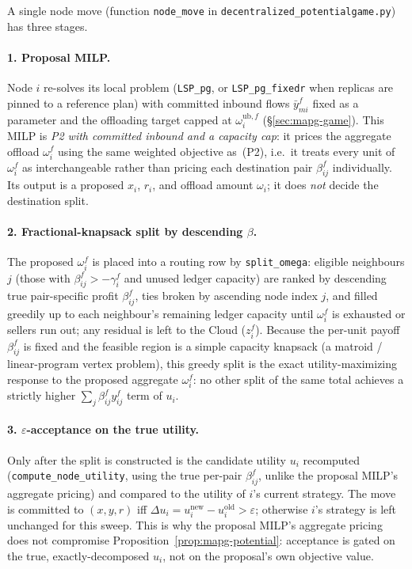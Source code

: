 A single node move (function \texttt{node\_move} in
\texttt{decentralized\_potentialgame.py}) has three stages.

\paragraph{1. Proposal MILP.} Node $i$ re-solves its local problem
(\texttt{LSP\_pg}, or \texttt{LSP\_pg\_fixedr} when replicas are pinned to a
reference plan) with committed inbound flows $\bar y_{mi}^f$ fixed as a
parameter and the offloading target capped at $\omega_i^{\mathrm{ub},f}$
(\S\ref{sec:mapg-game}). This MILP is \emph{P2 with committed inbound and a
capacity cap}: it prices the aggregate offload $\omega_i^f$ using the same
weighted objective as~(P2), i.e.\ it treats every unit of $\omega_i^f$ as
interchangeable rather than pricing each destination pair $\beta_{ij}^f$
individually. Its output is a proposed $x_i$, $r_i$, and offload amount
$\omega_i$; it does \emph{not} decide the destination split.

\paragraph{2. Fractional-knapsack split by descending $\beta$.} The proposed
$\omega_i^f$ is placed into a routing row by \texttt{split\_omega}: eligible
neighbours $j$ (those with $\beta_{ij}^f>-\gamma_i^f$ and unused ledger
capacity) are ranked by descending true pair-specific profit $\beta_{ij}^f$,
ties broken by ascending node index $j$, and filled greedily up to each
neighbour's remaining ledger capacity until $\omega_i^f$ is exhausted or
sellers run out; any residual is left to the Cloud ($z_i^f$). Because the
per-unit payoff $\beta_{ij}^f$ is fixed and the feasible region is a simple
capacity knapsack (a matroid / linear-program vertex problem), this greedy
split is the exact utility-maximizing response to the proposed aggregate
$\omega_i^f$: no other split of the same total achieves a strictly higher
$\sum_j\beta_{ij}^fy_{ij}^f$ term of $u_i$.

\paragraph{3. $\varepsilon$-acceptance on the true
utility.} Only after the split is constructed is the candidate utility $u_i$
recomputed (\texttt{compute\_node\_utility}, using the true per-pair
$\beta_{ij}^f$, unlike the proposal MILP's aggregate pricing) and compared to
the utility of $i$'s current strategy. The move is committed to $(x,y,r)$
iff $\Delta u_i = u_i^{\mathrm{new}}-u_i^{\mathrm{old}} > \varepsilon$;
otherwise $i$'s strategy is left unchanged for this sweep. This is why the
proposal MILP's aggregate pricing does not compromise Proposition~\ref{prop:mapg-potential}:
acceptance is gated on the true, exactly-decomposed $u_i$, not on the
proposal's own objective value.

